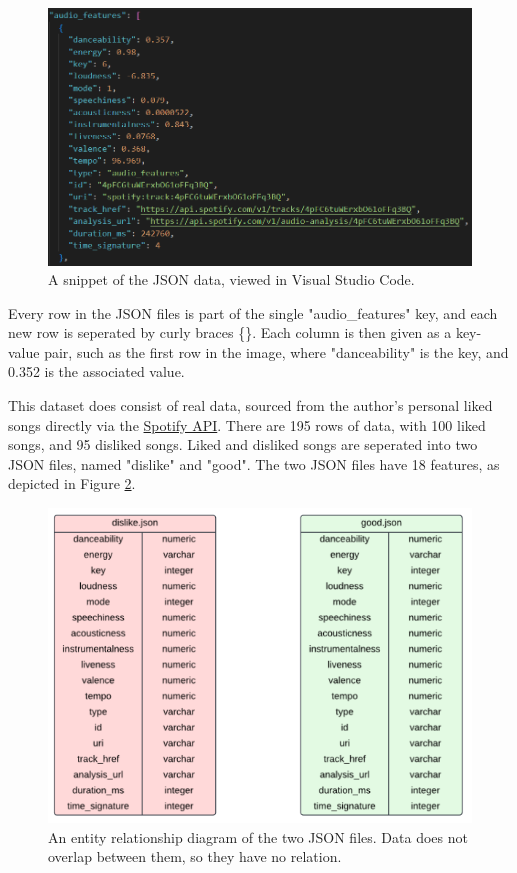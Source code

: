 \documentclass[12pt]{report}
\begin{document}
\begin{figure}[H]
    \centering
    \includegraphics[width=.75\linewidth]{spotifySnippet.png}
    \caption{A snippet of the JSON data, viewed in Visual Studio Code.}
    \label{fig:spotifySnippet}
\end{figure}

Every row in the JSON files is part of the single "audio\_features" key, and each new row is seperated by curly braces \{\}. Each column is then given as a 
key-value pair, such as the first row in the image, where "danceability" is the key, and 0.352 is the associated value.

\noindent This dataset does consist of real data, sourced from the author's personal liked songs directly via the 
\href{https://developer.spotify.com/documentation/web-api}{Spotify API}. There are 195 rows of data, with 100 liked songs, and 95 disliked songs.
Liked and disliked songs are seperated into two JSON files, named "dislike" and "good". The two JSON files have 18 features, as depicted in Figure 
\ref{fig:JSON-ERD}. 

\begin{figure}[H]
    \centering
    \includegraphics[width=.75\linewidth]{SpotifyJSON-ERD.png}
    \caption{An entity relationship diagram of the two JSON files. Data does not overlap between them, so they have no relation.}
    \label{fig:JSON-ERD}
\end{figure}
\end{document}

